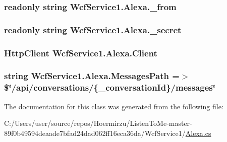 \subsubsection[{\texorpdfstring{\+\_\+from}{_from}}]{\setlength{\rightskip}{0pt plus 5cm}readonly string Wcf\+Service1.\+Alexa.\+\_\+from\hspace{0.3cm}{\ttfamily [private]}}\hypertarget{class_wcf_service1_1_1_alexa_a1c94ae34da8665a0918b04cbdfe7707e}{}\label{class_wcf_service1_1_1_alexa_a1c94ae34da8665a0918b04cbdfe7707e}
\subsubsection[{\texorpdfstring{\+\_\+secret}{_secret}}]{\setlength{\rightskip}{0pt plus 5cm}readonly string Wcf\+Service1.\+Alexa.\+\_\+secret\hspace{0.3cm}{\ttfamily [private]}}\hypertarget{class_wcf_service1_1_1_alexa_a7619c280d871d3abd9db45e733ffaaa5}{}\label{class_wcf_service1_1_1_alexa_a7619c280d871d3abd9db45e733ffaaa5}
\subsubsection[{\texorpdfstring{Client}{Client}}]{\setlength{\rightskip}{0pt plus 5cm}Http\+Client Wcf\+Service1.\+Alexa.\+Client}\hypertarget{class_wcf_service1_1_1_alexa_a62b57286b8d06d2328d1c160bd80f7c5}{}\label{class_wcf_service1_1_1_alexa_a62b57286b8d06d2328d1c160bd80f7c5}
\subsubsection[{\texorpdfstring{Messages\+Path}{MessagesPath}}]{\setlength{\rightskip}{0pt plus 5cm}string Wcf\+Service1.\+Alexa.\+Messages\+Path =$>$ \$\char`\"{}/api/conversations/\{{\bf \+\_\+conversation\+Id}\}/messages\char`\"{}\hspace{0.3cm}{\ttfamily [private]}}\hypertarget{class_wcf_service1_1_1_alexa_a7c8ee921966bce4aa52953d9a148e69b}{}\label{class_wcf_service1_1_1_alexa_a7c8ee921966bce4aa52953d9a148e69b}


The documentation for this class was generated from the following file\+:\begin{DoxyCompactItemize}
\item 
C\+:/\+Users/user/source/repos/\+Hoermirzu/\+Listen\+To\+Me-\/master-\/89f0b49594deaade7bfad24dad062ff16eca36da/\+Wcf\+Service1/\hyperlink{_alexa_8cs}{Alexa.\+cs}\end{DoxyCompactItemize}
